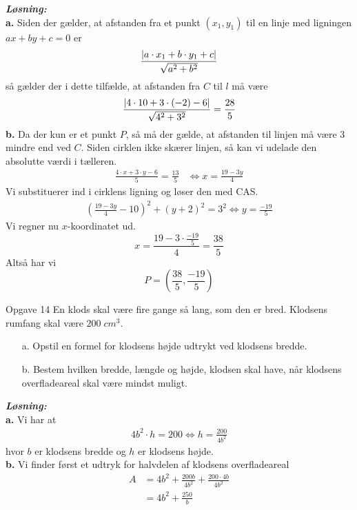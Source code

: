 \documentclass{article}
\newcommand{\sol}{\setlength{\parindent}{0cm}\textbf{\textit{Løsning:}}\setlength{\parindent}{1cm}}
\begin{document}
\sol \\
\textbf{a.}
Siden der gælder, at afstanden fra et punkt $(x_1,y_1)$ til en linje med ligningen $ax+by+c=0$ er 
\[
\frac{\abs{a \cdot x_1 + b \cdot y_1 + c} }{\sqrt{a^2+b^2} }
\] 
 så gælder der i dette tilfælde, at afstanden fra $C$ til $l$ må være
\[
\frac{\abs{4 \cdot 10 + 3 \cdot (-2)-6} }{\sqrt{4^2+3^2} }=\frac{28}{5}
\] 
\textbf{b.}
Da der kun er et punkt $P$, så må der gælde, at afstanden til linjen må være 3 mindre end ved $C$.
Siden cirklen ikke skærer linjen, så kan vi udelade den absolutte værdi i tælleren.
\begin{equation*}
\begin{split}
  \frac{4 \cdot x + 3 \cdot y -6}{5}=\frac{13}{5}&\iff x=\frac{19-3y}{4}
\end{split}
\end{equation*}
Vi substituerer ind i cirklens ligning og løser den med CAS.
\begin{equation*}
\begin{split}
  \left(\frac{19-3y}{4}-10\right)^2+(y+2)^2=3^2 \iff y=\frac{-19}{5}
\end{split}
\end{equation*}
Vi regner nu $x$-koordinatet ud.
\[
x=\frac{19-3 \cdot \frac{-19}{5}}{4}=\frac{38}{5}
\] 
Altså har vi
\[
P=\left(\frac{38}{5},\frac{-19}{5}\right) 
\] 
\begin{question}{Opgave 14}{}
  En klods skal være fire gange så lang, som den er bred. Klodsens rumfang skal være $200 \;\unit{cm^3} $.
  \begin{itemize}
    \item[a.] Opstil en formel for klodsens højde udtrykt ved klodsens bredde.
    \item[b.] Bestem hvilken bredde, længde og højde, klodsen skal have, når klodsens
overfladeareal skal være mindst muligt.
  \end{itemize}
\end{question}
\sol \\
\textbf{a.}
Vi har at
\begin{equation*}
\begin{split}
  4b^2 \cdot h=200 \iff h= \frac{200}{4b^2}
\end{split}
\end{equation*}
hvor $b$ er klodsens bredde og $h$ er klodsens højde. \\[1ex]
\textbf{b.}
Vi finder først et udtryk for halvdelen af klodsens overfladeareal
\begin{equation*}
\begin{split}
  A&=4b^2+\frac{200b}{4b^2} + \frac{200 \cdot 4b}{4b^2}\\ 
  &=4b^2+\frac{250}{b}
\end{split}
\end{equation*}
\end{document}
